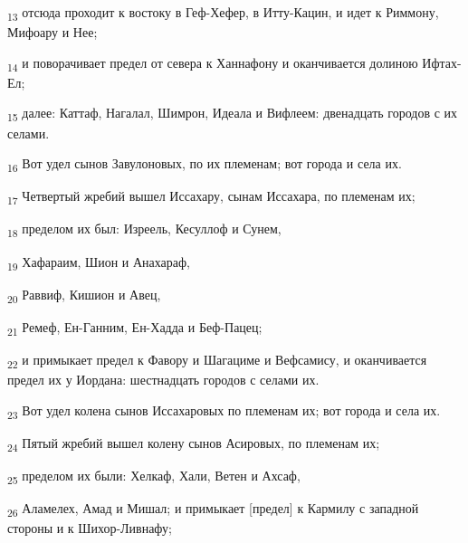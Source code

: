 \begin{tcolorbox}
\textsubscript{13} отсюда проходит к востоку в Геф-Хефер, в Итту-Кацин, и идет к Риммону, Мифоару и Нее;
\end{tcolorbox}
\begin{tcolorbox}
\textsubscript{14} и поворачивает предел от севера к Ханнафону и оканчивается долиною Ифтах-Ел;
\end{tcolorbox}
\begin{tcolorbox}
\textsubscript{15} далее: Каттаф, Нагалал, Шимрон, Идеала и Вифлеем: двенадцать городов с их селами.
\end{tcolorbox}
\begin{tcolorbox}
\textsubscript{16} Вот удел сынов Завулоновых, по их племенам; вот города и села их.
\end{tcolorbox}
\begin{tcolorbox}
\textsubscript{17} Четвертый жребий вышел Иссахару, сынам Иссахара, по племенам их;
\end{tcolorbox}
\begin{tcolorbox}
\textsubscript{18} пределом их был: Изреель, Кесуллоф и Сунем,
\end{tcolorbox}
\begin{tcolorbox}
\textsubscript{19} Хафараим, Шион и Анахараф,
\end{tcolorbox}
\begin{tcolorbox}
\textsubscript{20} Раввиф, Кишион и Авец,
\end{tcolorbox}
\begin{tcolorbox}
\textsubscript{21} Ремеф, Ен-Ганним, Ен-Хадда и Беф-Пацец;
\end{tcolorbox}
\begin{tcolorbox}
\textsubscript{22} и примыкает предел к Фавору и Шагациме и Вефсамису, и оканчивается предел их у Иордана: шестнадцать городов с селами их.
\end{tcolorbox}
\begin{tcolorbox}
\textsubscript{23} Вот удел колена сынов Иссахаровых по племенам их; вот города и села их.
\end{tcolorbox}
\begin{tcolorbox}
\textsubscript{24} Пятый жребий вышел колену сынов Асировых, по племенам их;
\end{tcolorbox}
\begin{tcolorbox}
\textsubscript{25} пределом их были: Хелкаф, Хали, Ветен и Ахсаф,
\end{tcolorbox}
\begin{tcolorbox}
\textsubscript{26} Аламелех, Амад и Мишал; и примыкает [предел] к Кармилу с западной стороны и к Шихор-Ливнафу;
\end{tcolorbox}
